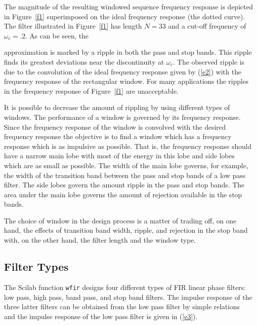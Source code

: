 The magnitude of the resulting windowed sequence frequency response 
is depicted in Figure~\ref{f1} superimposed on the ideal frequency
response (the dotted curve).  The filter illustrated in Figure~\ref{f1} 
has length $N=33$ and
a cut-off frequency of $\omega_c=.2$.  As can be seen, the 
%

%
approximation is marked by a ripple in both the pass
and stop bands.  This ripple finds its greatest deviations near the discontinuity
at $\omega_c$.  The observed ripple is due to the convolution of the
ideal frequency response given by (\ref{e2}) with the frequency response
of the rectangular window.  For many applications the ripples in the frequency 
response of Figure~\ref{f1} are unacceptable.

It is possible to decrease the amount of rippling by using different 
types of windows.
The performance of a window is governed by its frequency response.
Since the
frequency response of the window is convolved with the 
desired frequency response the 
objective is to find a window which has a frequency response which
is as impulsive as possible.  That is,  the frequency response 
should have a narrow main lobe with most of the energy
in this lobe and side lobes which are as small as possible.
The width of the main lobe governs, for example, the width
of the transition band between the pass and stop 
bands of a low pass filter.  The side lobes govern the amount 
ripple in the pass and stop bands.  The area under the main lobe
governs the amount of rejection available in
the stop bands. 

The choice of window in the design process is a matter
of trading off, on one hand, the effects of 
transition band width, ripple, and rejection in the stop band with,
on the other hand, the filter length and the window type.

\subsection{Filter Types}
\label{s2}

The Scilab function {\tt wfir} designs four different types
of FIR linear phase filters: low pass, high pass,
band pass, and stop band filters.  The impulse response of the three
latter filters can be obtained from the low pass filter by
simple relations and the impulse response of the
low pass filter is given in (\ref{e3}).

